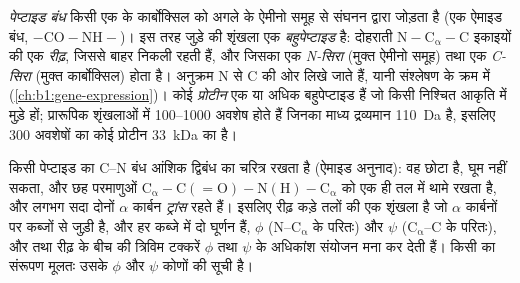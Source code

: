 \begin{definition}[पेप्टाइड बंध, बहुपेप्टाइड]\label{def:b1:proteins:peptide}
\emph{पेप्टाइड बंध} किसी एक  के
कार्बोक्सिल को अगले के ऐमीनो समूह से संघनन द्वारा जोड़ता है (एक ऐमाइड
बंध, $\mathrm{-CO{-}NH-}$)। इस तरह जुड़े  की शृंखला एक
\emph{बहुपेप्टाइड} है: दोहराती
$\mathrm{N{-}C_\alpha{-}C}$ इकाइयों की एक \emph{रीढ़}, जिससे  बाहर निकली रहती हैं, और जिसका एक \emph{N-सिरा} (मुक्त ऐमीनो
समूह) तथा एक \emph{C-सिरा} (मुक्त कार्बोक्सिल) होता है। अनुक्रम N से C
की ओर लिखे जाते हैं, यानी संश्लेषण के क्रम में (\cref{ch:b1:gene-expression})।
कोई \emph{प्रोटीन} एक या अधिक बहुपेप्टाइड हैं जो किसी
निश्चित आकृति में मुड़े हों; प्रारूपिक शृंखलाओं में \qtyrange{100}{1000}{}
अवशेष होते हैं जिनका माध्य द्रव्यमान \qty{110}{Da} है, इसलिए
\qty{300}{} अवशेषों का कोई प्रोटीन \qty{33}{kDa} का है।
\end{definition}

\begin{proposition}[पेप्टाइड बंध की ज्यामिति]\label{prop:b1:proteins:geometry}
किसी पेप्टाइड का C--N बंध आंशिक द्विबंध का चरित्र रखता है (ऐमाइड
अनुनाद): वह छोटा है, घूम नहीं सकता, और छह परमाणुओं
$\mathrm{C_\alpha{-}C(=O){-}N(H){-}C_\alpha}$ को एक ही तल में थामे रखता
है, और लगभग सदा दोनों $\alpha$ कार्बन \emph{ट्रांस} रहते हैं। इसलिए रीढ़
कड़े तलों की एक शृंखला है जो $\alpha$ कार्बनों पर कब्जों से जुड़ी है, और
हर कब्जे में दो घूर्णन हैं, $\phi$ (N--$\mathrm{C_\alpha}$ के परितः) और
$\psi$ ($\mathrm{C_\alpha}$--C के परितः), और  तथा रीढ़ के
बीच की त्रिविम टक्करें $\phi$ तथा $\psi$ के अधिकांश संयोजन मना कर देती
हैं। किसी  का संरूपण मूलतः उसके $\phi$ और $\psi$ कोणों की सूची
है।
\end{proposition}

